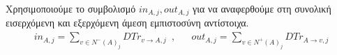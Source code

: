 {}
\begin{definition}
\label{inouttrust}
  Χρησιμοποιούμε το συμβολισμό $in_{A, j}, out_{A, j}$ για να αναφερθούμε στη συνολική εισερχόμενη και εξερχόμενη άμεση
  εμπιστοσύνη αντίστοιχα.
  \begin{align}
    in_{A, j} = \sum\limits_{v \in N^{-}\left(A\right)_j}DTr_{v \rightarrow A, j} \enspace,&&
    out_{A, j} = \sum\limits_{v \in N^{+}\left(A\right)_j}DTr_{A \rightarrow v, j}
  \end{align}
\end{definition}
